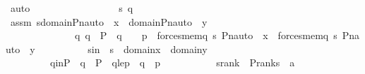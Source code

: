 \begin{isabellebody}
\ auto\ \isanewline
\ \ \ \ \ \ \isamarkupfalse%
\isanewline
\ \ \ \ \ \ \ \ \isamarkupfalse%
\ s\ q\ \isanewline
\ \ \ \ \ \ \ \ \isamarkupfalse%
\ assm{\isacharcolon}{\kern0pt}\ {\isachardoublequoteopen}{\isasymforall}s{\isacharprime}{\kern0pt}{\isasymin}domain{\isacharparenleft}{\kern0pt}Pn{\isacharunderscore}{\kern0pt}auto{\isacharparenleft}{\kern0pt}{\isasympi}{\isacharparenright}{\kern0pt}\ {\isacharbackquote}{\kern0pt}\ x{\isacharparenright}{\kern0pt}\ {\isasymunion}\ domain{\isacharparenleft}{\kern0pt}Pn{\isacharunderscore}{\kern0pt}auto{\isacharparenleft}{\kern0pt}{\isasympi}{\isacharparenright}{\kern0pt}\ {\isacharbackquote}{\kern0pt}\ y{\isacharparenright}{\kern0pt}{\isachardot}{\kern0pt}\isanewline
\ \ \ \ \ \ \ \ \ \ \ \ \ \ {\isasymforall}q{\isacharprime}{\kern0pt}{\isachardot}{\kern0pt}\ q{\isacharprime}{\kern0pt}\ {\isasymin}\ P\ {\isasymand}\ q{\isacharprime}{\kern0pt}\ {\isasympreceq}\ {\isasympi}\ {\isacharbackquote}{\kern0pt}\ p\ {\isasymlongrightarrow}\ forces{\isacharunderscore}{\kern0pt}mem{\isacharparenleft}{\kern0pt}q{\isacharprime}{\kern0pt}{\isacharcomma}{\kern0pt}\ s{\isacharprime}{\kern0pt}{\isacharcomma}{\kern0pt}\ Pn{\isacharunderscore}{\kern0pt}auto{\isacharparenleft}{\kern0pt}{\isasympi}{\isacharparenright}{\kern0pt}\ {\isacharbackquote}{\kern0pt}\ x{\isacharparenright}{\kern0pt}\ {\isasymlongleftrightarrow}\ forces{\isacharunderscore}{\kern0pt}mem{\isacharparenleft}{\kern0pt}q{\isacharprime}{\kern0pt}{\isacharcomma}{\kern0pt}\ s{\isacharprime}{\kern0pt}{\isacharcomma}{\kern0pt}\ Pn{\isacharunderscore}{\kern0pt}auto{\isacharparenleft}{\kern0pt}{\isasympi}{\isacharparenright}{\kern0pt}\ {\isacharbackquote}{\kern0pt}\ y{\isacharparenright}{\kern0pt}{\isachardoublequoteclose}\ \isanewline
\ \ \ \ \ \ \ \ \ sin\ {\isacharcolon}{\kern0pt}\ {\isachardoublequoteopen}s\ {\isasymin}\ domain{\isacharparenleft}{\kern0pt}x{\isacharparenright}{\kern0pt}\ {\isasymunion}\ domain{\isacharparenleft}{\kern0pt}y{\isacharparenright}{\kern0pt}{\isachardoublequoteclose}\ \isanewline
\ \ \ \ \ \ \ \ \ qinP\ {\isacharcolon}{\kern0pt}\ {\isachardoublequoteopen}q\ {\isasymin}\ P{\isachardoublequoteclose}\ \ qlep\ {\isacharcolon}{\kern0pt}\ {\isachardoublequoteopen}q\ {\isasympreceq}\ p{\isachardoublequoteclose}\ \isanewline
\isanewline
\ \ \ \ \ \ \ \ \isamarkupfalse%
\ srank\ {\isacharcolon}{\kern0pt}\ {\isachardoublequoteopen}P{\isacharunderscore}{\kern0pt}rank{\isacharparenleft}{\kern0pt}s{\isacharparenright}{\kern0pt}\ {\isacharless}{\kern0pt}\ a{\isachardoublequoteclose}\ \isamarkupfalse%

\end{isabellebody}
